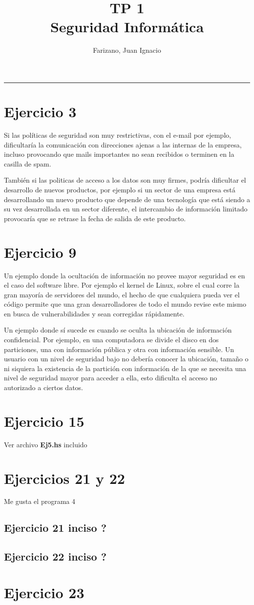 \documentclass[11pt]{article}
\title{
    TP 1 \\
    \large Seguridad Informática}
\author{Farizano, Juan Ignacio}
\date{}
\begin{document}
\maketitle

\rule{\textwidth}{1pt}

\section*{Ejercicio 3}
Si las políticas de seguridad son muy restrictivas, con el e-mail por ejemplo, dificultaría
la comunicación con direcciones ajenas a las internas de la empresa, incluso provocando
que mails importantes no sean recibidos o terminen en la casilla de spam.

También si las politicas de acceso a los datos son muy firmes, podría dificultar
el desarrollo de nuevos productos, por ejemplo si un sector de una empresa está
desarrollando un nuevo producto que depende de una tecnología que está siendo 
a su vez desarrollada en un sector diferente, el intercambio de información limitado
provocaría que se retrase la fecha de salida de este producto.


\section*{Ejercicio 9}
Un ejemplo donde la ocultación de información no provee mayor seguridad es en el 
caso del software libre. Por ejemplo el kernel de Linux, sobre el cual corre la gran
mayoría de servidores del mundo, el hecho de que cualquiera pueda ver el código
permite que una gran desarrolladores de todo el mundo revise este mismo en busca
de vulnerabilidades y sean corregidas rápidamente.

Un ejemplo donde sí sucede es cuando se oculta la ubicación de información
confidencial. Por ejemplo, en una computadora se divide el disco en dos particiones,
una con información pública y otra con información sensible. Un usuario con un 
nivel de seguridad bajo no debería conocer la ubicación, tamaño o ni siquiera la
existencia de la partición con información de la que se necesita una nivel de seguridad
mayor para acceder a ella, esto dificulta el acceso no autorizado a ciertos datos.

\section*{Ejercicio 15}
Ver archivo \textbf{Ej5.hs} incluido

\section*{Ejercicios 21 y 22}
Me gusta el programa 4
\subsection*{Ejercicio 21 inciso ?}
\subsection*{Ejercicio 22 inciso ?}

\section*{Ejercicio 23}
\end{document}
